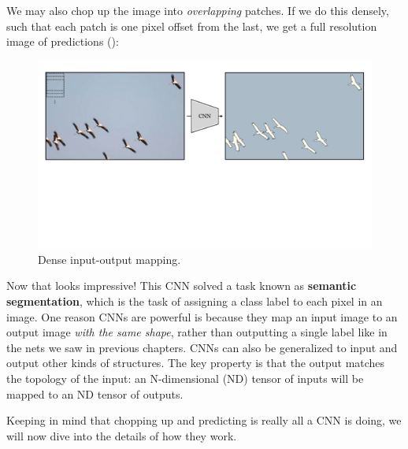 We may also chop up the image into \textit{overlapping} patches. If we do this densely, such that each patch is one pixel offset from the last, we get a full resolution image of predictions (\fig{\ref{fig:convolutional_neural_nets:CNN_example_fine}}):
\begin{figure}[h]
\centerline{
    \includegraphics[width=0.95\linewidth]{./figures/convolutional_neural_nets/CNN_example_fine.pdf}}
    \caption{Dense input-output mapping.}
    \label{fig:convolutional_neural_nets:CNN_example_fine}
\end{figure}
\vspace{-0.2cm}

Now that looks impressive! This CNN solved a task known as \textbf{semantic segmentation}, which is the task of assigning a class label to each pixel in an image. One reason CNNs are powerful is because they map an input image to an output image \textit{with the same shape}, rather than outputting a single label like in the nets we saw in previous chapters. CNNs can also be generalized to input and output other kinds of structures. The key property is that the output matches the topology of the input: an N-dimensional (ND) tensor of inputs will be mapped to an  ND tensor of outputs.%

Keeping in mind that chopping up and predicting is really all a CNN is doing, we will now dive into the details of how they work.

